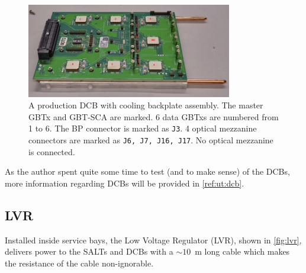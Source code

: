 \begin{figure}[!htb]
    \centering
    \includegraphics[width=0.8\textwidth]{./figs-ut-upgrade/dcb/dcb_prod.png}
    \caption{
        A production DCB with cooling backplate assembly.
        The master GBTx and GBT-SCA are marked.
        6 data GBTxs are numbered from 1 to 6.
        The BP connector is marked as \texttt{J3}.
        4 optical mezzanine connectors are marked as \texttt{J6, J7, J16, J17}.
        No optical mezzanine is connected.
    }
    \label{fig:dcb-prod}
\end{figure}

As the author spent quite some time to test (and to make sense) of the
DCBs, more information regarding DCBs will be provided in \cref{ref:ut:dcb}.


\subsection{LVR}
\label{ref:ut:overview:lvr}

Installed inside service bays, the Low Voltage Regulator (LVR),
shown in \cref{fig:lvr},
delivers power
to the SALTs and DCBs with a $\sim 10$~m long cable
which makes the resistance of the cable non-ignorable.

